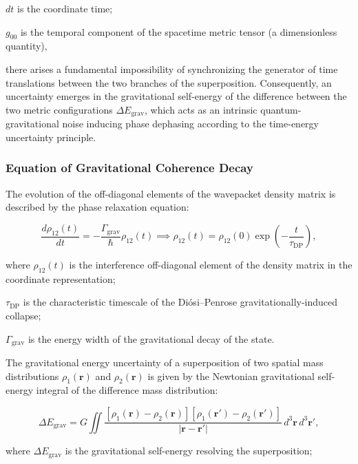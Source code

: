 $dt$ is the coordinate time;  

$g_{00}$ is the temporal component of the spacetime metric tensor (a dimensionless quantity),

there arises a fundamental impossibility of synchronizing the generator of time translations between the two branches of the superposition. Consequently, an uncertainty emerges in the gravitational self-energy of the difference between the two metric configurations $\Delta E_{\text{grav}}$, which acts as an intrinsic quantum-gravitational noise inducing phase dephasing according to the time-energy uncertainty principle.

\subsubsection{Equation of Gravitational Coherence Decay}\label{sec:5.2.2}

The evolution of the off-diagonal elements of the wavepacket density matrix is described by the phase relaxation equation:

\begin{equation}\label{eq:5.33}\tag{5.33}
\frac{d \rho_{12}(t)}{dt} = - \frac{\Gamma_{\text{grav}}}{\hbar} \rho_{12}(t) \implies \rho_{12}(t) = \rho_{12}(0) \exp\left( - \frac{t}{\tau_{\text{DP}}} \right),
\end{equation}

where $\rho_{12}(t)$ is the interference off-diagonal element of the density matrix in the coordinate representation;  

$\tau_{\text{DP}}$ is the characteristic timescale of the Diósi--Penrose gravitationally-induced collapse;  

$\Gamma_{\text{grav}}$ is the energy width of the gravitational decay of the state.

The gravitational energy uncertainty of a superposition of two spatial mass distributions $\rho_1(\mathbf{r})$ and $\rho_2(\mathbf{r})$ is given by the Newtonian gravitational self-energy integral of the difference mass distribution:

\begin{equation}\label{eq:5.34}\tag{5.34}
\Delta E_{\text{grav}} = G \iint \frac{[\rho_1(\mathbf{r}) - \rho_2(\mathbf{r})][\rho_1(\mathbf{r}') - \rho_2(\mathbf{r}')]}{|\mathbf{r} - \mathbf{r}'|} \, d^3\mathbf{r} \, d^3\mathbf{r}',
\end{equation}

where $\Delta E_{\text{grav}}$ is the gravitational self-energy resolving the superposition;  

